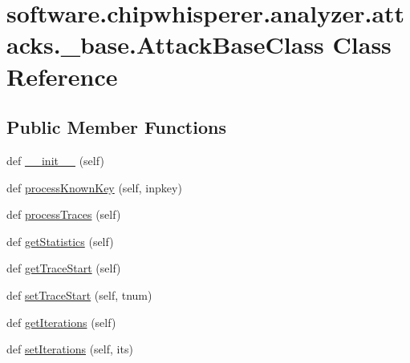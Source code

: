 \hypertarget{classsoftware_1_1chipwhisperer_1_1analyzer_1_1attacks_1_1__base_1_1AttackBaseClass}{}\section{software.\+chipwhisperer.\+analyzer.\+attacks.\+\_\+base.\+Attack\+Base\+Class Class Reference}
\label{classsoftware_1_1chipwhisperer_1_1analyzer_1_1attacks_1_1__base_1_1AttackBaseClass}
\subsection*{Public Member Functions}
\begin{DoxyCompactItemize}
\item 
def \hyperlink{classsoftware_1_1chipwhisperer_1_1analyzer_1_1attacks_1_1__base_1_1AttackBaseClass_a4e98b4cc0e436046901fc7a4182d3bd6}{\+\_\+\+\_\+init\+\_\+\+\_\+} (self)
\item 
def \hyperlink{classsoftware_1_1chipwhisperer_1_1analyzer_1_1attacks_1_1__base_1_1AttackBaseClass_a5ac1984be278cb84a59202562e62acdc}{process\+Known\+Key} (self, inpkey)
\item 
def \hyperlink{classsoftware_1_1chipwhisperer_1_1analyzer_1_1attacks_1_1__base_1_1AttackBaseClass_a49f0e4f8f6553eb5f7cc6a52cdbde5eb}{process\+Traces} (self)
\item 
def \hyperlink{classsoftware_1_1chipwhisperer_1_1analyzer_1_1attacks_1_1__base_1_1AttackBaseClass_adc63d79da1697287afcbbbfbfd08f586}{get\+Statistics} (self)
\item 
def \hyperlink{classsoftware_1_1chipwhisperer_1_1analyzer_1_1attacks_1_1__base_1_1AttackBaseClass_ab1e7d0bdbf9bcacf545f6c3b5d59db84}{get\+Trace\+Start} (self)
\item 
def \hyperlink{classsoftware_1_1chipwhisperer_1_1analyzer_1_1attacks_1_1__base_1_1AttackBaseClass_ac84a6973f7960eb77500699bb659f4b5}{set\+Trace\+Start} (self, tnum)
\item 
def \hyperlink{classsoftware_1_1chipwhisperer_1_1analyzer_1_1attacks_1_1__base_1_1AttackBaseClass_a333ae9cb1267866a28771f158e707247}{get\+Iterations} (self)
\item 
def \hyperlink{classsoftware_1_1chipwhisperer_1_1analyzer_1_1attacks_1_1__base_1_1AttackBaseClass_a4d2432407cd2d0aaa398847d4b718e5d}{set\+Iterations} (self, its)
\item 

\end{DoxyCompactItemize}
